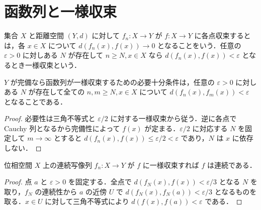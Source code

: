 \section{函数列と一様収束}
\begin{defn}[各点収束と一様収束]
集合 $X$ と距離空間 $(Y,d)$ に対して $f_n:X\to Y$ が $f:X\to Y$ に各点収束するとは，各 $x\in X$ について $d(f_n(x),f(x))\to0$ となることをいう．任意の $\varepsilon>0$ に対しある $N$ が存在して $n\geq N,x\in X$ なら $d(f_n(x),f(x))<\varepsilon$ となるとき一様収束という．
\end{defn}
\begin{prop}[一様Cauchy判定]
$Y$ が完備なら函数列が一様収束するための必要十分条件は，任意の $\varepsilon>0$ に対しある $N$ が存在して全ての $n,m\geq N,x\in X$ について $d(f_n(x),f_m(x))<\varepsilon$ となることである．
\end{prop}
\begin{proof}
必要性は三角不等式と $\varepsilon/2$ に対する一様収束から従う．逆に各点で Cauchy 列となるから完備性によって $f(x)$ が定まる．$\varepsilon/2$ に対応する $N$ を固定して $m\to\infty$ とすると $d(f_n(x),f(x))\leq\varepsilon/2<\varepsilon$ であり，$N$ は $x$ に依存しない．
\end{proof}
\begin{prop}[一様極限の連続性]
位相空間 $X$ 上の連続写像列 $f_n:X\to Y$ が $f$ に一様収束すれば $f$ は連続である．
\end{prop}
\begin{proof}
点 $a$ と $\varepsilon>0$ を固定する．全点で $d(f_N(x),f(x))<\varepsilon/3$ となる $N$ を取り，$f_N$ の連続性から $a$ の近傍 $U$ で $d(f_N(x),f_N(a))<\varepsilon/3$ となるものを取る．$x\in U$ に対して三角不等式により $d(f(x),f(a))<\varepsilon$ である．
\end{proof}

